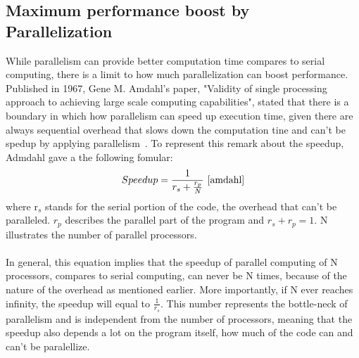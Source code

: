 \subsection{Maximum performance boost by Parallelization} 
While parallelism can provide better computation time compares to serial computing, there is a limit to how much parallelization can boost performance. Published in 1967, Gene M. Amdahl's paper, "Validity of single processing approach to achieving large scale computing capabilities", stated that there is a boundary in which how parallelism can speed up execution time, given there are always sequential overhead that slows down the computation tine and can't be spedup by applying parallelism~\cite{amdahl}. To represent this remark about the speedup, Admdahl gave a the following fomular: \\
\begin{equation}
Speedup = \frac{1}{r_s + \frac{r_p}{N}} ~\cite{amdahl} \\
\end{equation}
where r$_s$ stands for the serial portion of the code, the overhead that can't be paralleled. $r_p$ describes the parallel part of the program and $r_s + r_p = 1$. N illustrates the number of parallel processors. \\
~\\
In general, this equation implies that the speedup of parallel computing of N processors, compares to serial computing, can never be N times, because of the nature of the overhead as mentioned earlier. More importantly, if N ever reaches infinity, the speedup will equal to $\frac{1}{r_s}$. This number represents the bottle-neck of parallelism and is independent from the number of processors, meaning that the speedup also depends a lot on the program itself, how much of the code can and can't be paralellize. \\

